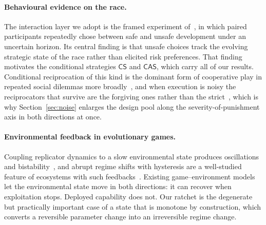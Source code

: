 \documentclass[pdflatex]{sn-jnl}
\theoremstyle{thmstyleone}
\theoremstyle{thmstylethree}
\theoremstyle{thmstyletwo}
\newcommand{\CS}{\textsf{CS}}
\newcommand{\CAS}{\textsf{CAS}}
\begin{document}
\paragraph{Behavioural evidence on the race.}
The interaction layer we adopt is the framed experiment of~\citet{domingos2026falling}, in which paired participants repeatedly chose
between safe and unsafe development under an uncertain horizon. Its central
finding is that unsafe choices track the evolving strategic state of the race
rather than elicited risk preferences. That finding motivates the conditional
strategies $\CS$ and $\CAS$, which carry all of our results. Conditional
reciprocation of this kind is the dominant form of cooperative play in repeated
social dilemmas more broadly~\citep{axelrod1981evolution,nowak1993winstay,fischbacher2001conditionally,dalbo2018determinants},
and when execution is noisy the reciprocators that survive are the forgiving
ones rather than the strict~\citep{molander1985optimal,nowak1992tit,fudenberg2012slow},
which is why Section~\ref{sec:noise} enlarges the design pool along the
severity-of-punishment axis in both directions at once.

\paragraph{Environmental feedback in evolutionary games.}
Coupling replicator dynamics to a slow environmental state produces
oscillations and bistability~\citep{weitz2016oscillating,hauert2019asymmetric,tilman2020feedbacks}, and abrupt regime shifts
with hysteresis are a well-studied feature of ecosystems with such feedbacks~\citep{scheffer2001catastrophic}. Existing game--environment models let the
environmental state move in both directions: it can recover when exploitation
stops. Deployed capability does not. Our ratchet is the degenerate but practically important
case of a state that is monotone by construction, which converts a reversible
parameter change into an irreversible regime change.
\end{document}
